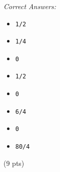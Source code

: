 \documentclass[10pt,dvips]{amsart}
\begin{document}
\par{\small{\it Correct Answers:}
\vspace{-\parskip}\begin{itemize}
\item\begin{verbatim}1/2\end{verbatim}
\item\begin{verbatim}1/4\end{verbatim}
\item\begin{verbatim}0\end{verbatim}
\item\begin{verbatim}1/2\end{verbatim}
\item\begin{verbatim}0\end{verbatim}
\item\begin{verbatim}6/4\end{verbatim}
\item\begin{verbatim}0\end{verbatim}
\item\begin{verbatim}80/4\end{verbatim}
\end{itemize}}\par
% 
% 


 (9 pts) \ifdim\lastskip=\pgmlMarker
  \let\pgmlPar=\relax
 \else
  \let\pgmlPar=\par
  \vadjust{\kern3pt}%
\fi
\end{document}
